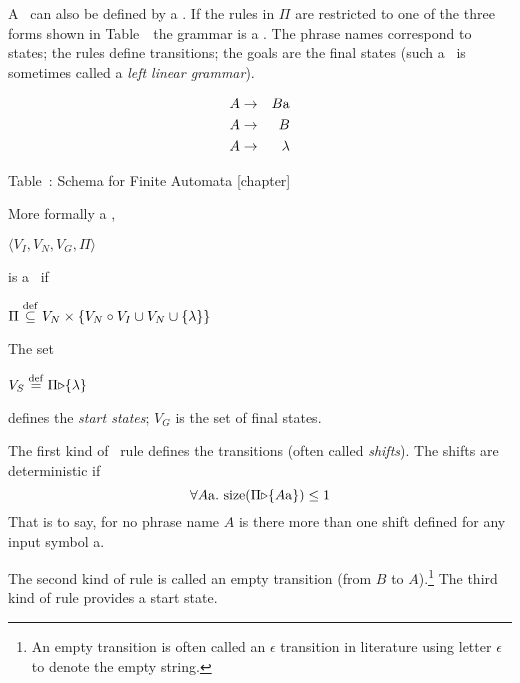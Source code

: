A \fa\ can also be defined by a \cfg.  
If the rules in $\Pi$ are restricted to one of the 
three forms shown in Table~\thetable\ the grammar is a \fa.  
The phrase names correspond to states; the rules define transitions; 
the goals are the final states (such a \cfg\ is
sometimes called a {\em left linear grammar}).


\begin{samepage}
\begin{eqnarray}
	A &\rightarrow& B {\rm a}		\\
	A &\rightarrow& B				    \\
	A &\rightarrow& \lambda		
\end{eqnarray}
\begin{center}
Table~\thetable: Schema for Finite Automata
[chapter]
\setcounter{NfaDfa}{\value{table}}
\end{center}
\end{samepage}

\noindent More formally a \cfg,

\begin{center}$\langle V_I, V_N, V_G, \Pi\rangle$ \end{center}

\noindent
is a \fa\ if

\begin{center}
   $\Pi \stackrel{\rm def}{\subseteq} V_N\times\{V_N\circ V_I \cup V_N \cup \{\lambda\}\}$
\end{center}

\noindent
The set

\begin{center}$V_S \stackrel{\rm def}{=} \Pi{\triangleright}\{\lambda\}$\end{center}

\noindent
defines the {\em start states}; $V_G$ is the set of final states.

The first kind of \fa\ rule defines the
transitions (often called {\em shifts}). 
The shifts are deterministic if
\begin{displaymath}
\forall A{\rm a}.\ {\rm size}(\Pi{\triangleright}\{A\rm a\}) \leq 1
\end{displaymath}
That is to say, for no phrase name $A$ is there more than one shift
defined for any input symbol a.

The second kind of rule is called an empty
transition (from $B$ to $A$).\footnote{An
empty transition is often called an $\epsilon$
transition in literature using letter
$\epsilon$ to denote the empty string.}  
The third kind of rule provides a start state.

